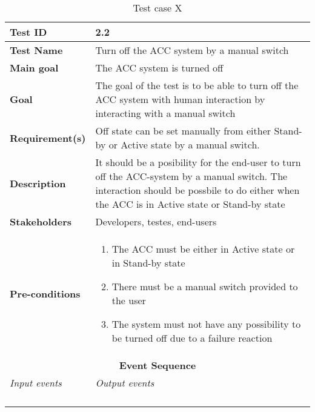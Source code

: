 \begin{table}[H]
\centering
\begin{tabularx}{\linewidth}{X|X}
  \hline
  \textbf{Test ID} & 2.2\\
  \hline
  \textbf{Test Name} & Turn off the ACC system by a manual switch\\
  \hline
  \textbf{Main goal} & The ACC system is turned off \\
  \hline
  \textbf{Goal} & The goal of the test is to be able to turn off the ACC system with human interaction by interacting with a manual switch \\
  \hline
  \textbf{Requirement(s)} & Off state can be set manually from either Stand-by or Active state by a manual switch. \\
  \hline
  \textbf{Description} & It should be a posibility for the end-user to turn off the ACC-system by a manual switch. The interaction should be possbile to do either when the ACC is in Active state or Stand-by state \\
  \hline
  \textbf{Stakeholders} & Developers, testes, end-users \\
  \hline
  \textbf{Pre-conditions} & 
  \begin{enumerate}
      \item The ACC must be either in Active state or in Stand-by state
      \item There must be a manual switch provided to the user
      \item The system must not have any possibility to be turned off due to a failure reaction
  \end{enumerate}\\
  \hline
  \multicolumn{2}{c}{\textbf{Event Sequence}} \\
  \hline
  \textit{Input events} & \textit{Output events} \\
  \hline
   &  \\
  \hline
   &  \\
  \hline
   &  \\
  \hline
   &  \\
  \hline
  \end{tabularx}
\caption{\label{tab_caseX} Test case X}
\end{table}



